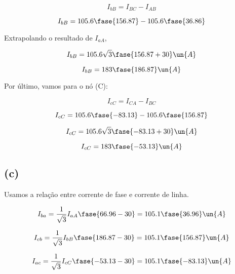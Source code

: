 \[ I_{bB} = I_{BC} - I_{AB} \]

\[ I_{bB} = 105.6\fase{156.87} - 105.6\fase{36.86} \]

Extrapolando o resultado de $I_{aA}$,  

\[ I_{bB} = 105.6\sqrt{3}\fase{156.87 + 30} \un{A} \]

\[ I_{bB} = 183\fase{186.87} \un{A} \]

Por último, vamos para o nó (C):

\[ I_{cC} = I_{CA} - I_{BC} \]

\[ I_{cC} = 105.6\fase{-83.13} - 105.6\fase{156.87} \]

\[ I_{cC} = 105.6\sqrt{3}\fase{-83.13 + 30} \un{A} \]

\[ I_{cC} = 183\fase{-53.13} \un{A} \]

\subsection*{(c)} 

Usamos a relação entre corrente de fase e corrente de linha.

\[ I_{ba} = \frac{1}{\sqrt{3}}I_{aA}\fase{66.96 - 30} = 105.1\fase{36.96} \un{A} \]

\[ I_{cb} = \frac{1}{\sqrt{3}}I_{bB}\fase{186.87 - 30} = 105.1\fase{156.87} \un{A} \]

\[ I_{ac} = \frac{1}{\sqrt{3}}I_{cC}\fase{-53.13 - 30} = 105.1\fase{-83.13} \un{A} \]



